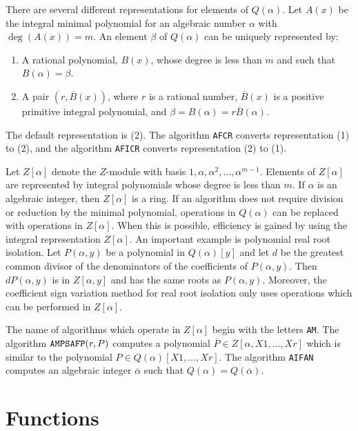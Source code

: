 There are several different representations for elements of $Q(\alpha)$.
Let $A(x)$ be the integral minimal polynomial for an algebraic number
$\alpha$ with $\deg(A(x)) = m$.  
An element $\beta$ of $Q(\alpha)$ can be uniquely represented by:
\begin{enumerate}
\item A rational polynomial, $B(x)$, whose degree is less than $m$ and such
that $B(\alpha) = \beta$.  
\item A pair $(r,\overline{B}(x))$, where $r$ is a rational number, 
$\overline{B}(x)$ is a positive primitive integral polynomial, 
and $\beta = B(\alpha) = r \overline{B}(\alpha)$. 
\end{enumerate}
The default representation is (2).  The algorithm {\tt AFCR} converts 
representation (1) to (2), and the algorithm {\tt AFICR} converts 
representation (2) to (1).

Let $Z[\alpha]$ denote the $Z$-module with basis
$1,\alpha,\alpha^2,\ldots,\alpha^{m-1}$.  Elements of $Z[\alpha]$ are
represented by integral polynomials whose degree is less than $m$.
If $\alpha$ is an algebraic integer, then $Z[\alpha]$ is a ring.
If an algorithm does not require division or reduction by the minimal 
polynomial, operations in $Q(\alpha)$ can be replaced with operations in
$Z[\alpha]$.  When this is possible, efficiency is gained by using the
integral representation $Z[\alpha]$.  An important example is polynomial
real root isolation.  Let $P(\alpha,y)$ be a polynomial in $Q(\alpha)[y]$ and
let $d$ be the greatest common divisor of the denominators of the coefficients
of $P(\alpha,y)$.  Then $dP(\alpha,y)$ is in $Z[\alpha,y]$ and has the 
same roots as $P(\alpha,y)$.
Moreover, the coefficient sign variation method for real root isolation
only uses operations which can be performed in $Z[\alpha]$.

The name of algorithms which operate in $Z[\alpha]$ begin with the letters
{\tt AM}.
The algorithm ${\tt AMPSAFP}(r,P)$ computes a polynomial 
$\overline{P} \in Z[\alpha,X1,\ldots,Xr]$ which is similar to the polynomial
$P \in Q(\alpha)[X1,\ldots,Xr]$.  The algorithm {\tt AIFAN} computes an
algebraic integer $\overline{\alpha}$ such that 
$Q(\alpha) = Q(\overline{\alpha})$.

\section{Functions}


